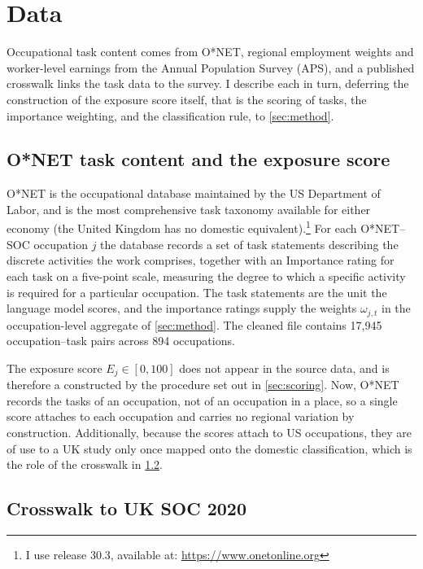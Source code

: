 \section{Data}\label{sec:data}

Occupational task content comes from O*NET, regional employment weights and worker-level earnings from the Annual Population Survey (APS), and a published crosswalk links the task data to the survey. I describe each in turn, deferring the construction of the exposure score itself, that is the scoring of tasks, the importance weighting, and the classification rule, to \cref{sec:method}.

\subsection{O*NET task content and the exposure score}\label{sec:onet}

O*NET is the occupational database maintained by the US Department of Labor, and is the most comprehensive task taxonomy available for either economy (the United Kingdom has no domestic equivalent).\footnote{I use release 30.3, available at: \url{https://www.onetonline.org}} For each O*NET--SOC occupation $j$ the database records a set of task statements describing the discrete activities the work comprises, together with an Importance rating for each task on a five-point scale, measuring the degree to which a specific activity is required for a particular occupation. The task statements are the unit the language model scores, and the importance ratings supply the weights $\omega_{j,t}$ in the occupation-level aggregate of \cref{sec:method}. The cleaned file contains 17,945 occupation--task pairs across 894 occupations.

The exposure score $E_j \in [0,100]$ does not appear in the source data, and is therefore a constructed by the procedure set out in \cref{sec:scoring}. Now, O*NET records the tasks of an occupation, not of an occupation in a place, so a single score attaches to each occupation and carries no regional variation by construction. Additionally, because the scores attach to US occupations, they are of use to a UK study only once mapped onto the domestic classification, which is the role of the crosswalk in \cref{sec:crosswalk}. 


\subsection{Crosswalk to UK SOC 2020}\label{sec:crosswalk}

